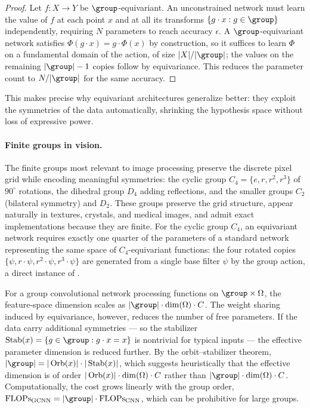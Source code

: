 \begin{proof}
Let $f: X \to Y$ be $\group$-equivariant. An unconstrained network must learn the
value of $f$ at each point $x$ and at all its transforms $\{g \cdot x : g \in
\group\}$ independently, requiring $N$ parameters to reach accuracy $\epsilon$. A
$\group$-equivariant network satisfies $\Phi(g \cdot x) = g \cdot \Phi(x)$ by
construction, so it suffices to learn $\Phi$ on a fundamental domain of the
action, of size $|X|/|\group|$; the values on the remaining $|\group| - 1$ copies
follow by equivariance. This reduces the parameter count to $N/|\group|$ for the
same accuracy.
\end{proof}

This makes precise why equivariant architectures generalize better: they exploit
the symmetries of the data automatically, shrinking the hypothesis space without
loss of expressive power.

\paragraph{Finite groups in vision.}
The finite groups most relevant to image processing preserve the discrete pixel
grid while encoding meaningful symmetries: the cyclic group $C_4 = \{e, r, r^2,
r^3\}$ of $90^\circ$ rotations, the dihedral group $D_4$ adding reflections, and
the smaller groups $C_2$ (bilateral symmetry) and $D_2$. These groups preserve
the grid structure, appear naturally in textures, crystals, and medical images,
and admit exact implementations because they are finite. For the cyclic group
$C_4$, an equivariant network requires exactly one quarter of the parameters of
a standard network representing the same space of $C_4$-equivariant functions:
the four rotated copies $\{\psi, r\cdot\psi, r^2\cdot\psi, r^3\cdot\psi\}$ are
generated from a single base filter $\psi$ by the group action, a direct
instance of .

\begin{remark}
\label{rem:groups:tradeoff}
For a group convolutional network processing functions on $\group \times
\Omega$, the feature-space dimension scales as $|\group| \cdot \dim(\Omega) \cdot
C$. The weight sharing induced by equivariance, however, reduces the number of
free parameters. If the data carry additional symmetries --- so the stabilizer
$\Stab(x) = \{g \in \group : g \cdot x = x\}$ is nontrivial for typical inputs
--- the effective parameter dimension is reduced further. By the
orbit--stabilizer theorem, $|\group| = |\Orb(x)| \cdot |\Stab(x)|$, which
suggests heuristically that the effective dimension is of order $|\operatorname{Orb}(x)| \cdot
\dim(\Omega) \cdot C$ rather than $|\group| \cdot \dim(\Omega) \cdot C$.
Computationally, the cost grows linearly with the group order, $\text{FLOPs}_{
\text{GCNN}} = |\group| \cdot \text{FLOPs}_{\text{CNN}}$, which can be
prohibitive for large groups.
\end{remark}

